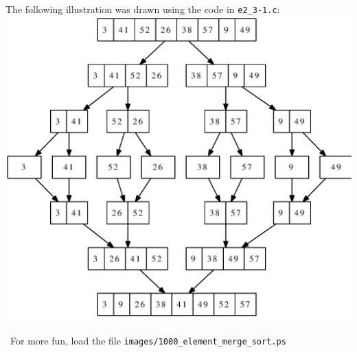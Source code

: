 The following illustration was drawn using the code in \texttt{e2\_3-1.c}: \\
\protect\includegraphics[scale=0.5]{images/e2_3-1_merge_sort.ps}
\\ \\
\noindent~For more fun, load the file \texttt{images/1000\_element\_merge\_sort.ps}
